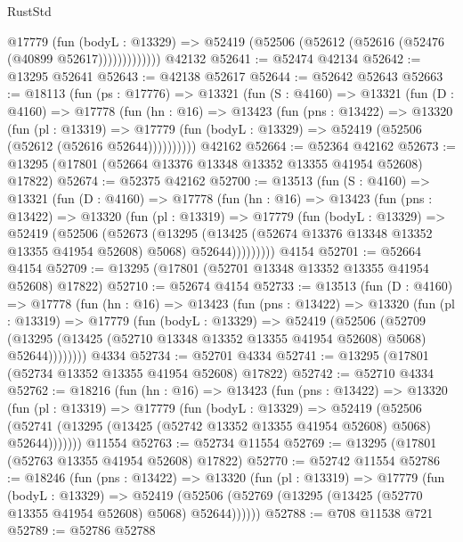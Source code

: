 \begin{lexlean}{RustStd}
\begin{coremodule}
                @17779
                  (fun (bodyL : @13329) =>
                  @52419 (@52506 (@52612 (@52616 (@52476 (@40899 @52617)))))))))))))
    @42132
@52641 := @52474 @42134
@52642 := @13295 @52641
@52643 := @42138 @52617
@52644 := @52642 @52643
@52663 := @18113
    (fun (ps : @17776) =>
    @13321
      (fun (S : @4160) =>
      @13321
        (fun (D : @4160) =>
        @17778
          (fun (hn : @16) =>
          @13423
            (fun (pns : @13422) =>
            @13320
              (fun (pl : @13319) =>
              @17779 (fun (bodyL : @13329) => @52419 (@52506 (@52612 (@52616 @52644))))))))))
    @42162
@52664 := @52364 @42162
@52673 := @13295 (@17801 (@52664 @13376 @13348 @13352 @13355 @41954 @52608) @17822)
@52674 := @52375 @42162
@52700 := @13513
    (fun (S : @4160) =>
    @13321
      (fun (D : @4160) =>
      @17778
        (fun (hn : @16) =>
        @13423
          (fun (pns : @13422) =>
          @13320
            (fun (pl : @13319) =>
            @17779
              (fun (bodyL : @13329) =>
              @52419
                (@52506
                  (@52673
                    (@13295
                      (@13425 (@52674 @13376 @13348 @13352 @13355 @41954 @52608) @5068)
                      @52644)))))))))
    @4154
@52701 := @52664 @4154
@52709 := @13295 (@17801 (@52701 @13348 @13352 @13355 @41954 @52608) @17822)
@52710 := @52674 @4154
@52733 := @13513
    (fun (D : @4160) =>
    @17778
      (fun (hn : @16) =>
      @13423
        (fun (pns : @13422) =>
        @13320
          (fun (pl : @13319) =>
          @17779
            (fun (bodyL : @13329) =>
            @52419
              (@52506
                (@52709
                  (@13295 (@13425 (@52710 @13348 @13352 @13355 @41954 @52608) @5068) @52644))))))))
    @4334
@52734 := @52701 @4334
@52741 := @13295 (@17801 (@52734 @13352 @13355 @41954 @52608) @17822)
@52742 := @52710 @4334
@52762 := @18216
    (fun (hn : @16) =>
    @13423
      (fun (pns : @13422) =>
      @13320
        (fun (pl : @13319) =>
        @17779
          (fun (bodyL : @13329) =>
          @52419
            (@52506
              (@52741 (@13295 (@13425 (@52742 @13352 @13355 @41954 @52608) @5068) @52644)))))))
    @11554
@52763 := @52734 @11554
@52769 := @13295 (@17801 (@52763 @13355 @41954 @52608) @17822)
@52770 := @52742 @11554
@52786 := @18246
    (fun (pns : @13422) =>
    @13320
      (fun (pl : @13319) =>
      @17779
        (fun (bodyL : @13329) =>
        @52419 (@52506 (@52769 (@13295 (@13425 (@52770 @13355 @41954 @52608) @5068) @52644))))))
@52788 := @708 @11538 @721
@52789 := @52786 @52788

\end{coremodule}
\end{lexlean}
